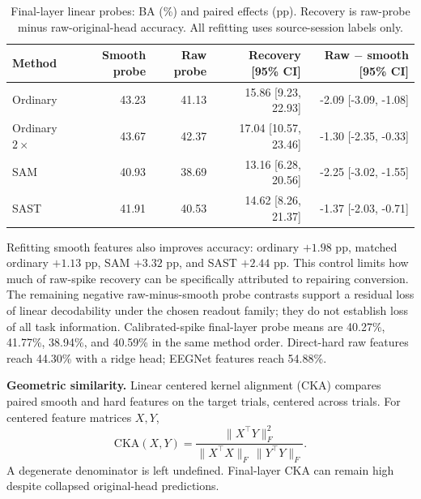 \documentclass[11pt,a4paper]{article}
\begin{document}
\begin{table}[h]
\centering\small\setlength{\tabcolsep}{4pt}
\caption{Final-layer linear probes: BA (\%) and paired effects (pp).
Recovery is raw-probe minus raw-original-head accuracy. All refitting uses
source-session labels only.}
\begin{tabular}{lrrrr}
\toprule
Method & Smooth probe & Raw probe & Recovery [95\% CI] & Raw $-$ smooth [95\% CI] \\
\midrule
Ordinary & 43.23 & 41.13 & 15.86 [9.23, 22.93] & -2.09 [-3.09, -1.08] \\
Ordinary $2\times$ & 43.67 & 42.37 & 17.04 [10.57, 23.46] & -1.30 [-2.35, -0.33] \\
SAM & 40.93 & 38.69 & 13.16 [6.28, 20.56] & -2.25 [-3.02, -1.55] \\
SAST & 41.91 & 40.53 & 14.62 [8.26, 21.37] & -1.37 [-2.03, -0.71] \\
\bottomrule
\end{tabular}
\end{table}

Refitting smooth features also improves accuracy: ordinary $+1.98$ pp,
matched ordinary $+1.13$ pp, SAM $+3.32$ pp, and SAST $+2.44$ pp.
This control limits how much of raw-spike recovery can be specifically
attributed to repairing conversion. The remaining negative raw-minus-smooth
probe contrasts support a residual loss of linear decodability under the
chosen readout family; they do not establish loss of all task information.
Calibrated-spike final-layer probe means are 40.27\%, 41.77\%, 38.94\%,
and 40.59\% in the same method order. Direct-hard raw features reach 44.30\%
with a ridge head; EEGNet features reach 54.88\%.

\textbf{Geometric similarity.} Linear centered kernel alignment (CKA)
\citep{kornblith} compares paired smooth and hard features on the target
trials, centered across trials. For centered feature matrices $X,Y$,
\[
\mathrm{CKA}(X,Y)=\frac{\|X^\top Y\|_F^2}
{\|X^\top X\|_F\,\|Y^\top Y\|_F}.
\]
A degenerate denominator is left undefined.
Final-layer CKA can remain high despite collapsed original-head predictions.
\end{document}
